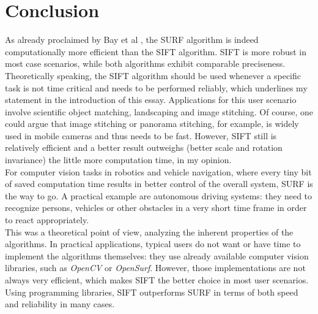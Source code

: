 \documentclass[a4paper, 11pt]{article} %
\begin{document}
\section*{Conclusion}
\label{sec:conclusion}
As already proclaimed by Bay et al \cite{bay2008speeded}, the SURF algorithm is indeed computationally more efficient than the SIFT algorithm. SIFT is more robust in most case scenarios, while both algorithms exhibit comparable preciseness. Theoretically speaking, the SIFT algorithm should be used whenever a specific task is not time critical and needs to be performed reliably, which underlines my statement in the introduction of this essay. Applications for this user scenario involve scientific object matching, landscaping and image stitching. Of course, one could argue that image stitching or panorama stitching, for example, is widely used in mobile cameras and thus needs to be fast. However, SIFT still is relatively efficient and a better result outweighs (better scale and rotation invariance) the little more computation time, in my opinion. \\
For computer vision tasks in robotics and vehicle navigation, where every tiny bit of saved computation time results in better control of the overall system, SURF is the way to go. A practical example are autonomous driving systems: they need to recognize persons, vehicles or other obstacles in a very short time frame in order to react appropriately. \\
This was a theoretical point of view, analyzing the inherent properties of the algorithms. In practical applications, typical users do not want or have time to implement the algorithms themselves: they use already available computer vision libraries, such as \textit{OpenCV} or \textit{OpenSurf}. However, those implementations are not always very efficient, which makes SIFT the better choice in most user scenarios. Using programming libraries, SIFT outperforms SURF in terms of both speed and reliability \cite{evans2009notes} in many cases. 


\printbibliography

%


\end{document}
